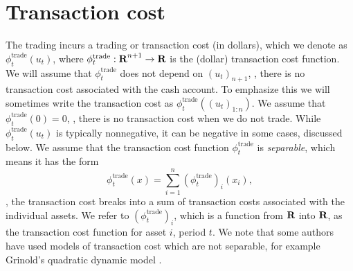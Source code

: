 \documentclass[openany]{now}
\newcommand{\trcost}{\phi^\mathrm{trade}}
\begin{document}
\section{Transaction cost}
The trading incurs a trading or transaction cost (in dollars), which we denote as $\trcost_t(u_t)$,
where $\trcost_t: \reals^{n+1} \to \reals$ is the (dollar) transaction cost function.
We will assume that $\trcost_t$ does not depend on $(u_t)_{n+1}$, \ie,
there is no transaction cost associated with the cash account.
To emphasize this we will sometimes write the transaction cost as
$\trcost_t((u_t)_{1:n})$.
We assume that $\trcost_t(0)=0$, \ie,
there is no transaction cost when we do not trade.
While $\trcost_t(u_t)$ is typically nonnegative, it can be negative in some cases,
discussed below.
We assume that the transaction cost function $\trcost_t$ is \emph{separable},
which means it has the form
\[
\trcost_t(x) = \sum_{i=1}^n (\trcost_t)_i(x_i),
\]
\ie, the transaction cost breaks into a sum of transaction costs
associated with the individual assets.
We refer to $(\trcost_t)_i$, which is a function from ${\mbox{\bf R}}$ into ${\mbox{\bf R}}$,
as the transaction cost function for asset $i$, period $t$.
We note that some authors have used models of transaction cost which are
not separable, for example Grinold's quadratic dynamic
model \cite{grinold2006dynamic}.
\end{document}
